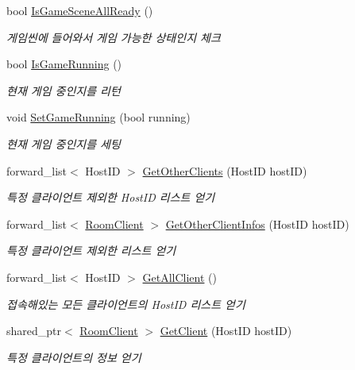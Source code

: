 \begin{DoxyCompactItemize}
bool \hyperlink{class_game_room_a9ddf75762a180d08b98955405d94a3bb}{Is\+Game\+Scene\+All\+Ready} ()
\begin{DoxyCompactList}\small\item\em 게임씬에 들어와서 게임 가능한 상태인지 체크 \end{DoxyCompactList}\item 
bool \hyperlink{class_game_room_adf07d76d35c157f22d677f1570d957dc}{Is\+Game\+Running} ()
\begin{DoxyCompactList}\small\item\em 현재 게임 중인지를 리턴 \end{DoxyCompactList}\item 
void \hyperlink{class_game_room_a8e423ee03803dacb43d097cd87cc220b}{Set\+Game\+Running} (bool running)
\begin{DoxyCompactList}\small\item\em 현재 게임 중인지를 세팅 \end{DoxyCompactList}\item 
forward\+\_\+list$<$ Host\+ID $>$ \hyperlink{class_game_room_a0aa2b2cb945ade2e34de76684a8d7724}{Get\+Other\+Clients} (Host\+ID host\+ID)
\begin{DoxyCompactList}\small\item\em 특정 클라이언트 제외한 Host\+ID 리스트 얻기 \end{DoxyCompactList}\item 
forward\+\_\+list$<$ \hyperlink{class_room_client}{Room\+Client} $>$ \hyperlink{class_game_room_acb8d3aa5a447d62dad96224d6eb4e8e4}{Get\+Other\+Client\+Infos} (Host\+ID host\+ID)
\begin{DoxyCompactList}\small\item\em 특정 클라이언트 제외한 리스트 얻기 \end{DoxyCompactList}\item 
forward\+\_\+list$<$ Host\+ID $>$ \hyperlink{class_game_room_a183a24527a56433cc85b1cd1c86012a8}{Get\+All\+Client} ()
\begin{DoxyCompactList}\small\item\em 접속해있는 모든 클라이언트의 Host\+ID 리스트 얻기 \end{DoxyCompactList}\item 
shared\+\_\+ptr$<$ \hyperlink{class_room_client}{Room\+Client} $>$ \hyperlink{class_game_room_af9eed2640f6fe818e1528d997895f8d6}{Get\+Client} (Host\+ID host\+ID)
\begin{DoxyCompactList}\small\item\em 특정 클라이언트의 정보 얻기 \end{DoxyCompactList}\end{DoxyCompactItemize}
